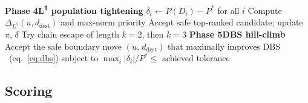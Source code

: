 \begin{algorithm}[htbp]
\begin{algorithmic}[1]
\EndWhile
\vspace{4pt}
\Statex \hspace{-\algorithmicindent}\textbf{Phase 4\enspace L\textsuperscript{1} population tightening}
\State $\delta_i \leftarrow P(D_i) - P^*$ for all $i$
\Repeat
        \State Compute $\Delta_{L^1}(u,d_{\mathrm{dest}})$ and max-norm priority
    \EndFor
    \State Accept safe top-ranked candidate; update $\pi$, $\delta$
        \State Try chain escape of length $k=2$, then $k=3$
    \EndIf
{}
\vspace{4pt}
\Statex \hspace{-\algorithmicindent}\textbf{Phase 5\enspace DBS hill-climb}
\Repeat
    \State Accept the safe boundary move $(u,\,d_{\mathrm{dest}})$ that
           maximally improves $\mathrm{DBS}$~(eq.~\ref{eq:dbs})
           subject to $\max_i|\delta_i|/P^* \leq$ achieved tolerance
\end{algorithmic}
\end{algorithm}

\subsection{Scoring}

